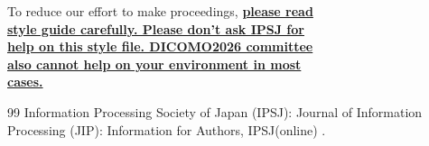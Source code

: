 \documentclass[English]{dicomopapers}
\begin{document}
To reduce our effort to make proceedings,
{\bf \underline{please read}}\\
{\bf \underline{style guide carefully. Please don't ask IPSJ for}}\\
{\bf \underline{help on this style file. DICOMO2026 committee}}\\
{\bf \underline{also cannot help on your environment in most}}\\
{\bf \underline{cases.}}

\begin{thebibliography}{99}
  Information Processing Society of Japan (IPSJ): Journal of Information
  Processing (JIP): Information for Authors, IPSJ(online)
  .
\end{thebibliography}
\end{document}
